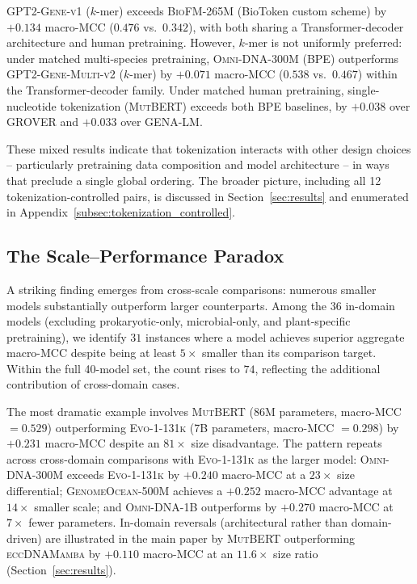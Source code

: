 \documentclass{article}
\theoremstyle{plain}
\theoremstyle{definition}
\theoremstyle{remark}
\begin{document}
\textsc{GPT2-Gene-v1} ($k$-mer) exceeds \textsc{BioFM-265M} (BioToken
custom scheme) by $+0.134$ macro-MCC ($0.476$ vs.\ $0.342$), with both
sharing a Transformer-decoder architecture and human pretraining.
However, $k$-mer is not uniformly preferred: under matched
multi-species pretraining, \textsc{Omni-DNA-300M} (BPE) outperforms
\textsc{GPT2-Gene-Multi-v2} ($k$-mer) by $+0.071$ macro-MCC ($0.538$
vs.\ $0.467$) within the Transformer-decoder family. Under matched
human pretraining, single-nucleotide tokenization (\textsc{MutBERT})
exceeds both BPE baselines, by $+0.038$ over \textsc{GROVER} and
$+0.033$ over \textsc{GENA-LM}.

These mixed results indicate that tokenization interacts with other
design choices -- particularly pretraining data composition and model
architecture -- in ways that preclude a single global ordering. The
broader picture, including all 12 tokenization-controlled pairs, is
discussed in Section~\ref{sec:results} and enumerated in
Appendix~\ref{subsec:tokenization_controlled}.

\subsection{The Scale--Performance Paradox}
\label{subsec:paradox}

A striking finding emerges from cross-scale comparisons: numerous
smaller models substantially outperform larger counterparts. Among
the $36$ in-domain models (excluding prokaryotic-only, microbial-only,
and plant-specific pretraining), we identify $31$ instances where a
model achieves superior aggregate macro-MCC despite being at least
$5\times$ smaller than its comparison target. Within the full
40-model set, the count rises to $74$, reflecting the additional
contribution of cross-domain cases.

The most dramatic example involves \textsc{MutBERT} (86M parameters,
macro-MCC $= 0.529$) outperforming \textsc{Evo-1-131k} (7B parameters,
macro-MCC $= 0.298$) by $+0.231$ macro-MCC despite an
$81\times$ size disadvantage. The pattern repeats across cross-domain
comparisons with \textsc{Evo-1-131k} as the larger model:
\textsc{Omni-DNA-300M} exceeds \textsc{Evo-1-131k} by
$+0.240$ macro-MCC at a $23\times$ size differential;
\textsc{GenomeOcean-500M} achieves a $+0.252$ macro-MCC advantage at
$14\times$ smaller scale; and \textsc{Omni-DNA-1B} outperforms by
$+0.270$ macro-MCC at $7\times$ fewer parameters. In-domain
reversals (architectural rather than domain-driven) are illustrated
in the main paper by \textsc{MutBERT} outperforming \textsc{eccDNAMamba}
by $+0.110$ macro-MCC at an $11.6\times$ size ratio
(Section~\ref{sec:results}).
\end{document}
